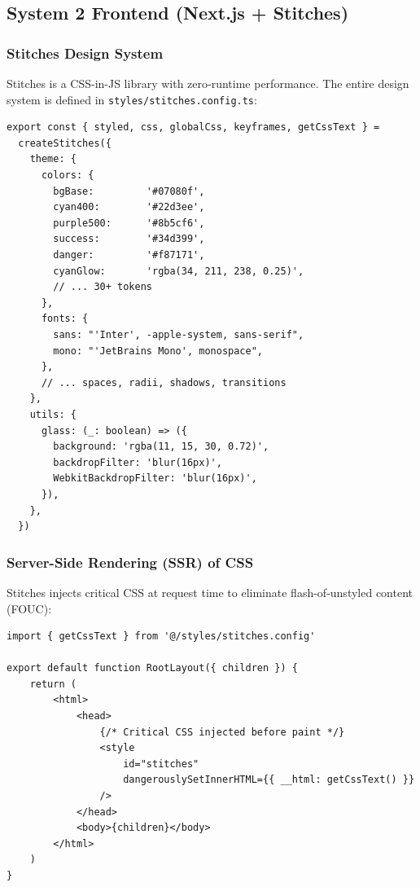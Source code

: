 \documentclass[12pt,a4paper]{article}
\begin{document}
\subsection{System 2 Frontend (Next.js + Stitches)}

\subsubsection{Stitches Design System}

Stitches is a CSS-in-JS library with zero-runtime performance. The entire
design system is defined in \texttt{styles/stitches.config.ts}:

\begin{lstlisting}[style=tsstyle, caption={Stitches Token Configuration (excerpt)}]
export const { styled, css, globalCss, keyframes, getCssText } =
  createStitches({
    theme: {
      colors: {
        bgBase:         '#07080f',
        cyan400:        '#22d3ee',
        purple500:      '#8b5cf6',
        success:        '#34d399',
        danger:         '#f87171',
        cyanGlow:       'rgba(34, 211, 238, 0.25)',
        // ... 30+ tokens
      },
      fonts: {
        sans: "'Inter', -apple-system, sans-serif",
        mono: "'JetBrains Mono', monospace",
      },
      // ... spaces, radii, shadows, transitions
    },
    utils: {
      glass: (_: boolean) => ({
        background: 'rgba(11, 15, 30, 0.72)',
        backdropFilter: 'blur(16px)',
        WebkitBackdropFilter: 'blur(16px)',
      }),
    },
  })
\end{lstlisting}

\subsubsection{Server-Side Rendering (SSR) of CSS}

Stitches injects critical CSS at request time to eliminate flash-of-unstyled
content (FOUC):

\begin{lstlisting}[style=tsstyle, caption={SSR CSS Injection in app/layout.tsx}]
import { getCssText } from '@/styles/stitches.config'

export default function RootLayout({ children }) {
    return (
        <html>
            <head>
                {/* Critical CSS injected before paint */}
                <style
                    id="stitches"
                    dangerouslySetInnerHTML={{ __html: getCssText() }}
                />
            </head>
            <body>{children}</body>
        </html>
    )
}
\end{lstlisting}
\end{document}
